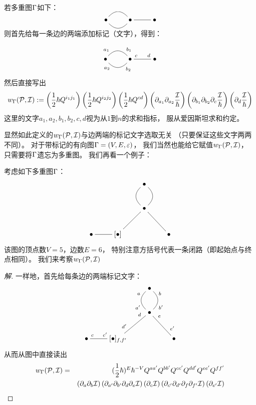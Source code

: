 \begin{example}若多重图$\Gamma$如下：
$$
  \xymatrix{
     \bullet  \ar@{-}@/^1pc/[r]
              \ar@{-}@/_1pc/[r]
    &\bullet  \ar@{-}[r]
    &\bullet
  }
$$
则首先给每一条边的两端添加标记（文字），得到：

$$
  \xymatrix{
     \bullet  \ar@{-}@/^1pc/[r]^<<{a_1}^>>{b_1}
              \ar@{-}@/_1pc/[r]_<<{a_2}_>>{b_2}
    &\bullet  \ar@{-}[r]^<<{c}^>>{d}
    &\bullet
  }
$$
然后直接写出
$$
  w_\Gamma(\mathcal{P},\mathcal{I})
:=
  \left(\frac{1}{2}\hbar Q^{i_1j_1}\right)
  \left(\frac{1}{2}\hbar Q^{i_2j_2}\right)
  \left(\frac{1}{2}\hbar Q^{cd}\right)
  \left(\partial_{a_1}\partial_{a_2}\frac{\mathcal{I}}{\hbar}\right)
  \left(\partial_{b_1}\partial_{b_2}\partial_c\frac{\mathcal{I}}{\hbar}\right)
  \left(\partial_{d}\frac{\mathcal{I}}{\hbar}\right)
$$
这里的文字$a_1,a_2,b_1,b_2,c,d$视为从$1$到$n$的求和指标，
服从爱因斯坦求和约定。
\end{example}

显然如此定义的$w_\Gamma(\mathcal{P},\mathcal{I})$与边两端的标记文字选取无关
（只要保证这些文字两两不同）。
对于带标记的有向图$\Gamma=(V,E,\varepsilon)$，
我们当然也能给它赋值$w_\Gamma(\mathcal{P},\mathcal{I})$，
只需要将$\Gamma$遗忘为多重图。
我们再看一个例子：

\begin{example}考虑如下多重图$\Gamma$：
$$
  \xymatrix{
     &&\bullet   \ar@{-}@/_1pc/[d]
                 \ar@{-}@/^1pc/[d]
     &
  \\
     &&\bullet   \ar@{-}[dl]
                 \ar@{-}[dr]
     &
  \\
       \bullet   \ar@{-}[r]
     & [\bullet]
     &&\bullet
  }
$$
该图的顶点数$V=5$，边数$E=6$，
特别注意方括号代表一条闭路（即起始点与终点相同）。
我们来考察$w_\Gamma(\mathcal{P},\mathcal{I})$
\end{example}

\begin{proof}[解]
一样地，首先给每条边的两端标记文字：
$$
  \xymatrix{
     &&\bullet   \ar@{-}@/_1pc/[d] _<<<{a}_>>>{a'}
                 \ar@{-}@/^1pc/[d] ^<<<{b}^>>>{b'}
     &
  \\
     &&\bullet   \ar@{-}[dl] _<<<{d}_>>>{d'}
                 \ar@{-}[dr] ^<<<{e}^>>>{e'}
     &
  \\
       \bullet   \ar@{-}[r] ^<<{c}^>>{c'}
     & [\bullet]_{f,f'}
     &&\bullet
  }
$$
从而从图中直接读出
\begin{eqnarray*}
     w_\Gamma(\mathcal{P},\mathcal{I})
&=&
     (\frac{1}{2}\hbar)^E\hbar^{-V}
     Q^{aa'}Q^{bb'}Q^{cc'}Q^{dd'}Q^{ee'}Q^{ff'}\\
& &
     \left(\partial_{a}\partial_{b}\mathcal{I}\right)
     \left(\partial_{a'}\partial_{b'}\partial_{d}\partial_{e}\mathcal{I}\right)
     \left(\partial_{c}\mathcal{I}\right)
     \left(\partial_{c'}\partial_{d'}\partial_{f}\partial_{f'}\mathcal{I}\right)
     \left(\partial_{e'}\mathcal{I}\right)
\end{eqnarray*}
\end{proof}


